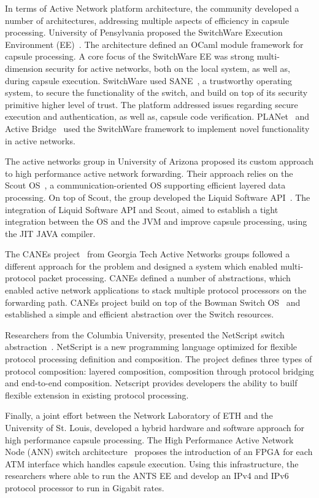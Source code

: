 In terms of Active Network platform architecture, the community developed a
number of architectures, addressing multiple aspects of efficiency in capsule
processing. University of Pensylvania proposed the SwitchWare Execution
Environment (EE)~\cite{Alexander1998}.  The architecture defined an OCaml module
framework for capsule processing. A core focus of the SwitchWare EE was strong
multi-dimension security for active networks, both on the local system, as well
as, during capsule execution.  SwitchWare used SANE~\cite{Alexander1998b}, a
trustworthy operating system, to secure the functionality of the switch, and
build on top of its security primitive higher level of trust. The platform
addressed issues regarding secure execution and authentication, as well as,
capsule code verification.  PLANet~\cite{Hicks1999} and Active
Bridge~\cite{Alexander1997b} used the SwitchWare framework to implement novel
functionality in active networks. 

The active networks group in University of Arizona proposed its custom approach
to high performance active network forwarding. Their approach relies on the Scout
OS~\cite{Montz1995}, a communication-oriented OS supporting efficient
layered data processing. On top of Scout, the group developed the Liquid Software
API~\cite{Hartman1999}. The integration of Liquid Software API and Scout, aimed to
establish a tight integration between the OS and the JVM and improve capsule
processing, using the JIT JAVA compiler. 

The CANEs project~\cite{Chae2002} from Georgia Tech Active Networks groups
followed a different approach for the problem and designed a system which
enabled multi-protocol packet processing. CANEs defined a number of
abstractions, which enabled active network applications to stack multiple
protocol processors on the forwarding path. CANEs project build on top of the
Bowman Switch OS~\cite{merugu1999} and established a simple and efficient
abstraction over the Switch resources. 

Researchers from the Columbia University, presented the NetScript switch
abstraction~\cite{daSilva2001}. NetScript is a new programming language
optimized for flexible protocol processing definition and composition. The
project defines three types of protocol composition: layered composition,
composition through protocol bridging and end-to-end composition. Netscript
provides developers the ability to builf flexible extension in existing protocol processing. 

Finally, a joint effort between the Network Laboratory of ETH and the University
of St. Louis, developed a hybrid hardware and software approach for high
performance capsule processing. The High Performance Active Network Node (ANN)
switch architecture~\cite{Decasper1999} proposes the introduction of an FPGA for
each ATM interface which handles capsule execution. Using this infrastructure,
the researchers where able to run the ANTS EE and develop an IPv4 and IPv6
protocol processor to run in Gigabit rates. 

